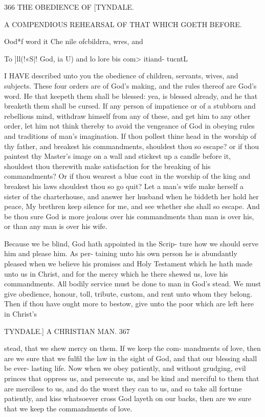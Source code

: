 \documentclass{custom}
\begin{document}
{366
THE OBEDIENCE OF
[TYNDALE.

A COMPENDIOUS REHEARSAL OF THAT WHICH 
GOETH BEFORE. 

Ood*f word 
it Che nile 
ofcbildrra, 
wres, and 

To ]ll(!«S|! 
God, ia U) 
and lo lore 
bis com> 
itiand- 
tucntL 

I HAVE described unto you the obedience of children, 
servants, wives, and subjects. These four orders are of 
God's making, and the rules thereof are God's word. 
He that keepeth them shall be blessed: yea, is blessed 
already, and he that breaketh them shall be cursed. If 
any person of impatience or of a stubborn and rebellious 
mind, withdraw himself from any of these, and get him to 
any other order, let him not think thereby to avoid the 
vengeance of God in obeying rules and traditions of man's 
imagination. If thou pollest thine head in the worship of 
thy father, and breakest his commandments, shouldest thou 
so escape? or if thou paintest thy Master's image on a wall 
and stickest up a candle before it, shouldest thou therewith 
make satisfaction for the breaking of his commandments? 
Or if thou wearest a blue coat in the worship of the king 
and breakest his laws shouldest thou so go quit? Let a man's 
wife make herself a sister of the charterhouse, and answer 
her husband when he biddeth her hold her peace, My 
brethren keep silence for me, and see whether she shall so 
escape. And be thou sure God is more jealous over his 
commandments than man is over his, or than any man is 
over his wife. 

Because we be blind, God hath appointed in the Scrip- 
ture how we should serve him and please him. As per- 
taining unto his own person he is abundantly pleased when 
we believe his promises and Holy Testament which he 
hath made unto us in Christ, and for the mercy which he 
there shewed us, love his commandments. All bodily 
service must be done to man in God's stead. We must 
give obedience, honour, toll, tribute, custom, and rent 
unto whom they belong. Then if thou have ought more 
to bestow, give unto the poor which are left here in Christ's 


TYNDALE.]
A CHRISTIAN MAN.
367

stead, that we shew mercy on them. If we keep the com- 
mandments of love, then are we sure that we fulfil the law 
in the sight of God, and that our blessing shall be ever- 
lasting life. Now when we obey patiently, and without 
grudging, evil princes that oppress us, and persecute us, 
and be kind and merciful to them that are merciless to us, 
and do the worst they can to us, and so take all fortune 
patiently, and kiss whatsoever cross God layeth on our 
backs, then are we sure that we keep the commandments 
of love. 

}
\end{document}
